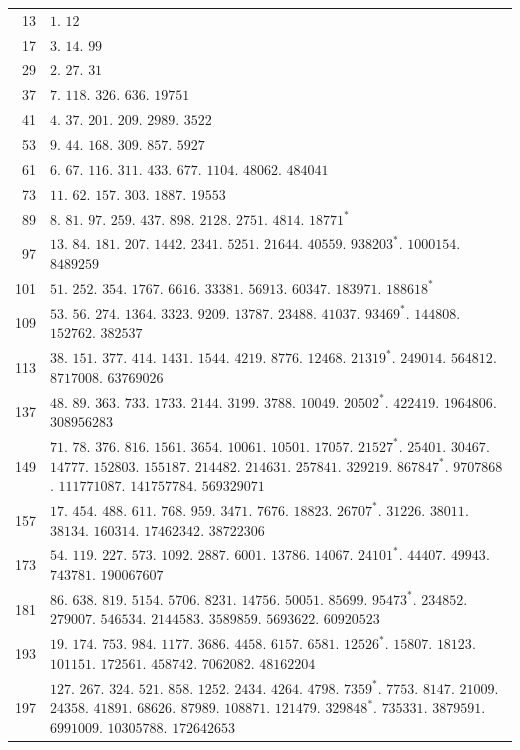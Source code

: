\begin{longtable}{@{}r|p{\dimexpr\linewidth-38pt\relax}@{}}
13 & $1$. $12$\\
17 & $3$. $14$. $99$\\
29 & $2$. $27$. $31$\\
37 & $7$. $118$. $326$. $636$. $19751$\\
41 & $4$. $37$. $201$. $209$. $2989$. $3522$\\
53 & $9$. $44$. $168$. $309$. $857$. $5927$\\
61 & $6$. $67$. $116$. $311$. $433$. $677$. $1104$. $48062$. $484041$\\
73 & $11$. $62$. $157$. $303$. $1887$. $19553$\\
89 & $8$. $81$. $97$. $259$. $437$. $898$. $2128$. $2751$. $4814$. $18771^{*}$\\
97 & $13$. $84$. $181$. $207$. $1442$. $2341$. $5251$. $21644$. $40559$. $938203^{*}$. $1000154$. $8489259$\\
101 & $51$. $252$. $354$. $1767$. $6616$. $33381$. $56913$. $60347$. $183971$. $188618^{*}$\\
109 & $53$. $56$. $274$. $1364$. $3323$. $9209$. $13787$. $23488$. $41037$. $93469^{*}$. $144808$. $152762$. $382537$\\
113 & $38$. $151$. $377$. $414$. $1431$. $1544$. $4219$. $8776$. $12468$. $21319^{*}$. $249014$. $564812$. $8717008$. $63769026$\\
137 & $48$. $89$. $363$. $733$. $1733$. $2144$. $3199$. $3788$. $10049$. $20502^{*}$. $422419$. $1964806$. $308956283$\\
149 & $71$. $78$. $376$. $816$. $1561$. $3654$. $10061$. $10501$. $17057$. $21527^{*}$. $25401$. $30467$. $14777$. $152803$. $155187$. $214482$. $214631$. $257841$. $329219$. $867847^{*}$. $9707868$. $111771087$. $141757784$. $569329071$\\
157 & $17$. $454$. $488$. $611$. $768$. $959$. $3471$. $7676$. $18823$. $26707^{*}$. $31226$. $38011$. $38134$. $160314$. $17462342$. $38722306$\\
173 & $54$. $119$. $227$. $573$. $1092$. $2887$. $6001$. $13786$. $14067$. $24101^{*}$. $44407$. $49943$. $743781$. $190067607$\\
181 & $86$. $638$. $819$. $5154$. $5706$. $8231$. $14756$. $50051$. $85699$. $95473^{*}$. $234852$. $279007$. $546534$. $2144583$. $3589859$. $5693622$. $60920523$\\
193 & $19$. $174$. $753$. $984$. $1177$. $3686$. $4458$. $6157$. $6581$. $12526^{*}$. $15807$. $18123$. $101151$. $172561$. $458742$. $7062082$. $48162204$\\
197 & $127$. $267$. $324$. $521$. $858$. $1252$. $2434$. $4264$. $4798$. $7359^{*}$. $7753$. $8147$. $21009$. $24358$. $41891$. $68626$. $87989$. $108871$. $121479$. $329848^{*}$. $735331$. $3879591$. $6991009$. $10305788$. $172642653$\\
\end{longtable}\endgroup
